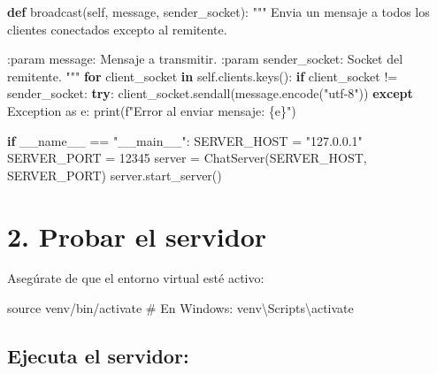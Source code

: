 \documentclass[
  a4paper,
  DIV=11,
  numbers=noendperiod,
  onepage,
  openany]{scrreprt}
\newenvironment{Shaded}{\begin{snugshade}}{\end{snugshade}}
\newcommand{\BuiltInTok}[1]{\textcolor[rgb]{0.00,0.23,0.31}{#1}}
\newcommand{\CommentTok}[1]{\textcolor[rgb]{0.37,0.37,0.37}{#1}}
\newcommand{\ControlFlowTok}[1]{\textcolor[rgb]{0.00,0.23,0.31}{\textbf{#1}}}
\newcommand{\DecValTok}[1]{\textcolor[rgb]{0.68,0.00,0.00}{#1}}
\newcommand{\ImportTok}[1]{\textcolor[rgb]{0.00,0.46,0.62}{#1}}
\newcommand{\KeywordTok}[1]{\textcolor[rgb]{0.00,0.23,0.31}{\textbf{#1}}}
\newcommand{\NormalTok}[1]{\textcolor[rgb]{0.00,0.23,0.31}{#1}}
\newcommand{\OperatorTok}[1]{\textcolor[rgb]{0.37,0.37,0.37}{#1}}
\newcommand{\PreprocessorTok}[1]{\textcolor[rgb]{0.68,0.00,0.00}{#1}}
\newcommand{\SpecialCharTok}[1]{\textcolor[rgb]{0.37,0.37,0.37}{#1}}
\newcommand{\SpecialStringTok}[1]{\textcolor[rgb]{0.13,0.47,0.30}{#1}}
\newcommand{\StringTok}[1]{\textcolor[rgb]{0.13,0.47,0.30}{#1}}
\newcommand{\VariableTok}[1]{\textcolor[rgb]{0.07,0.07,0.07}{#1}}
\begin{document}
\begin{Shaded}
\begin{Highlighting}[]
    \KeywordTok{def}\NormalTok{ broadcast(}\VariableTok{self}\NormalTok{, message, sender\_socket):}
        \CommentTok{"""}
\CommentTok{        Envia un mensaje a todos los clientes conectados excepto al remitente.}

\CommentTok{        :param message: Mensaje a transmitir.}
\CommentTok{        :param sender\_socket: Socket del remitente.}
\CommentTok{        """}
        \ControlFlowTok{for}\NormalTok{ client\_socket }\KeywordTok{in} \VariableTok{self}\NormalTok{.clients.keys():}
            \ControlFlowTok{if}\NormalTok{ client\_socket }\OperatorTok{!=}\NormalTok{ sender\_socket:}
                \ControlFlowTok{try}\NormalTok{:}
\NormalTok{                    client\_socket.sendall(message.encode(}\StringTok{"utf{-}8"}\NormalTok{))}
                \ControlFlowTok{except} \PreprocessorTok{Exception} \ImportTok{as}\NormalTok{ e:}
                    \BuiltInTok{print}\NormalTok{(}\SpecialStringTok{f"Error al enviar mensaje: }\SpecialCharTok{\{}\NormalTok{e}\SpecialCharTok{\}}\SpecialStringTok{"}\NormalTok{)}


\ControlFlowTok{if} \VariableTok{\_\_name\_\_} \OperatorTok{==} \StringTok{"\_\_main\_\_"}\NormalTok{:}
\NormalTok{    SERVER\_HOST }\OperatorTok{=} \StringTok{"127.0.0.1"}
\NormalTok{    SERVER\_PORT }\OperatorTok{=} \DecValTok{12345}
\NormalTok{    server }\OperatorTok{=}\NormalTok{ ChatServer(SERVER\_HOST, SERVER\_PORT)}
\NormalTok{    server.start\_server()}
\end{Highlighting}
\end{Shaded}

\section{2. Probar el servidor}\label{probar-el-servidor}

Asegúrate de que el entorno virtual esté activo:

\begin{Shaded}
\begin{Highlighting}[]
\BuiltInTok{source}\NormalTok{ venv/bin/activate  }\CommentTok{\# En Windows: venv\textbackslash{}Scripts\textbackslash{}activate}
\end{Highlighting}
\end{Shaded}

\subsection{Ejecuta el servidor:}\label{ejecuta-el-servidor}
\end{document}
